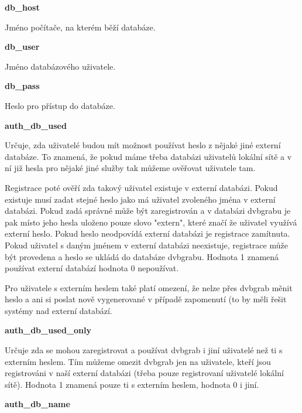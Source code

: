 \vspace{10pt}

\textbf{db\_host}

Jméno počítače, na kterém běží databáze.

\vspace{10pt}

\textbf{db\_user}

Jméno databázového uživatele.

\vspace{10pt}

\textbf{db\_pass}

Heslo pro přístup do databáze.

\vspace{10pt}

\textbf{auth\_db\_used}

Určuje, zda uživatelé budou mít možnost používat heslo z nějaké jiné externí databáze. To znamená, že pokud máme třeba databázi uživatelů lokální sítě a v ní již hesla pro nějaké jiné služby tak můžeme ověřovat uživatele tam.

Registrace poté ověří zda takový uživatel existuje v externí databázi. Pokud existuje musí zadat stejné heslo jako má uživatel zvoleného jména v externí databázi. Pokud zadá správné může být zaregistrován a v databázi dvbgrabu je pak místo jeho hesla uloženo pouze slovo "extern", které značí že uživatel využívá externí heslo. Pokud heslo neodpovídá externí databázi je registrace zamítnuta. Pokud uživatel s daným jménem v externí databázi neexistuje, registrace může být provedena a heslo se ukládá do databáze dvbgrabu. Hodnota 1 znamená používat externí databází hodnota 0 nepoužívat.

Pro uživatele s externím heslem také platí omezení, že nelze přes dvbgrab měnit heslo a ani si poslat nově vygenerované v případě zapomenutí (to by měli řešit systémy nad externí databází.

\vspace{10pt}

\textbf{auth\_db\_used\_only}

Určuje zda se mohou zaregistrovat a používat dvbgrab i jiní uživatelé než ti s externím heslem. Tím můžeme omezit dvbgrab jen na uživatele, kteří jsou registrováni v naší externí databázi (třeba pouze registrovaní uživatelé lokální sítě). Hodnota 1 znamená pouze ti s externím heslem, hodnota 0 i jiní.

\vspace{10pt}

\textbf{auth\_db\_name}

